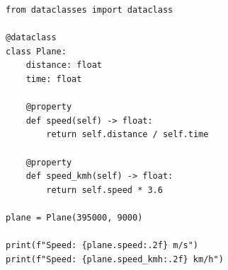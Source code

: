 \begin{verbatim}
from dataclasses import dataclass

@dataclass
class Plane:
    distance: float  
    time: float     

    @property
    def speed(self) -> float:
        return self.distance / self.time

    @property
    def speed_kmh(self) -> float:
        return self.speed * 3.6

plane = Plane(395000, 9000)

print(f"Speed: {plane.speed:.2f} m/s")
print(f"Speed: {plane.speed_kmh:.2f} km/h")
\end{verbatim}